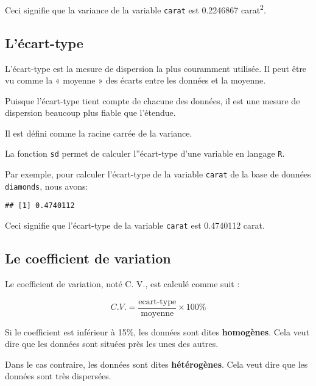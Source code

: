 \documentclass[]{book}
\newenvironment{Shaded}{\begin{snugshade}}{\end{snugshade}}
\newcommand{\KeywordTok}[1]{\textcolor[rgb]{0.13,0.29,0.53}{\textbf{#1}}}
\newcommand{\OperatorTok}[1]{\textcolor[rgb]{0.81,0.36,0.00}{\textbf{#1}}}
\newcommand{\NormalTok}[1]{#1}
\begin{document}
Ceci signifie que la variance de la variable \texttt{carat} est
0.2246867 carat\textsuperscript{2}.

\subsection{L'écart-type}\label{lecart-type}

L'écart-type est la mesure de dispersion la plus couramment utilisée. Il
peut être vu comme la « moyenne » des écarts entre les données et la
moyenne.

Puisque l'écart-type tient compte de chacune des données, il est une
mesure de dispersion beaucoup plus fiable que l'étendue.

Il est défini comme la racine carrée de la variance.

La fonction \texttt{sd} permet de calculer l''écart-type d'une variable
en langage \texttt{R}.

Par exemple, pour calculer l'écart-type de la variable \texttt{carat} de
la base de données \texttt{diamonds}, nous avons:

\begin{Shaded}
\end{Shaded}

\begin{verbatim}
## [1] 0.4740112
\end{verbatim}

Ceci signifie que l'écart-type de la variable \texttt{carat} est
0.4740112 carat.

\subsection{Le coefficient de
variation}\label{le-coefficient-de-variation}

Le coefficient de variation, noté C. V., est calculé comme suit :

\begin{equation}
C.V. = \dfrac{\text{ecart-type}}{\text{moyenne}}\times 100\%
\end{equation}

Si le coefficient est inférieur à 15\%, les données sont dites
\textbf{homogènes}. Cela veut dire que les données sont situées près les
unes des autres.

Dans le cas contraire, les données sont dites \textbf{hétérogènes}. Cela
veut dire que les données sont très dispersées.
\end{document}
